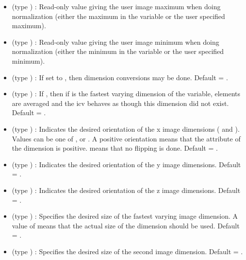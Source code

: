 \begin{itemize}
\item {} (type ) : Read-only value
giving the user image maximum when doing normalization (either the
maximum in the variable or the user specified maximum).

\item {} (type ) : Read-only value
giving the user image minimum when doing normalization (either the
minimum in the variable or the user specified minimum).

\item {} (type ) : If set to 
, then dimension conversions may be done. Default =
.

\item {} (type ) : If ,
then if  is the fastest varying dimension of
the variable, elements are averaged and the icv behaves as though this
dimension did not exist. Default = .

\item {} (type ) : Indicates the
desired orientation of the x image dimensions ( and
). Values can be one of ,
 or . A positive
orientation means that the  attribute of the dimension is
positive.  means that no flipping is done.
Default = .

\item {} (type ) : Indicates the
desired orientation of the y image dimensions. Default =
. 

\item {} (type ) : Indicates the
desired orientation of the z image dimensions. Default =
. 

\item {} (type ) : Specifies the
desired size of the fastest varying image dimension. A value of
 means that the actual size of the dimension
should be used. Default = .

\item {} (type ) : Specifies the
desired size of the second image dimension. Default =
. 


\end{itemize}
